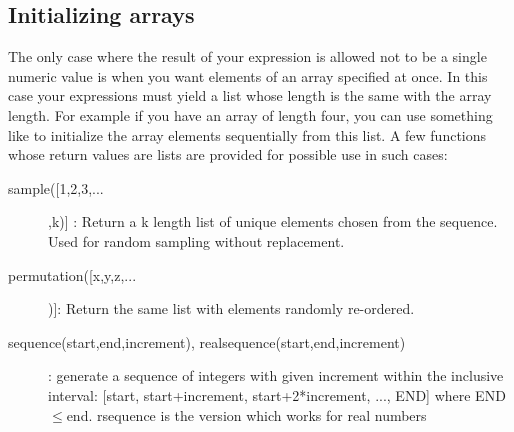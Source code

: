 \subsection{Initializing arrays}
\label{sec:arrayinit}
The only case where the result of your expression is allowed not to be a single numeric value is when you want elements of an array specified at once. In this case your expressions must yield a list whose length is the same with the array length. For example if you have an array of length four, you can use something like \example{[1,2,3,4]} to initialize the array elements sequentially from this list. A few functions whose return values are lists are provided for possible use in such cases:
\begin{description}  
   \item[sample([1,2,3,...],k)] : Return a k length list of unique elements chosen from the sequence. Used for random sampling without replacement.
   \item[permutation([x,y,z,...])]: Return the same list with elements randomly re-ordered.
   \item[sequence(start,end,increment), realsequence(start,end,increment)] : generate a sequence of integers with given increment within the inclusive interval: [start, start+increment, start+2*increment, ..., END] where END$\le$end. rsequence is the version which works for real numbers
\end{description}


